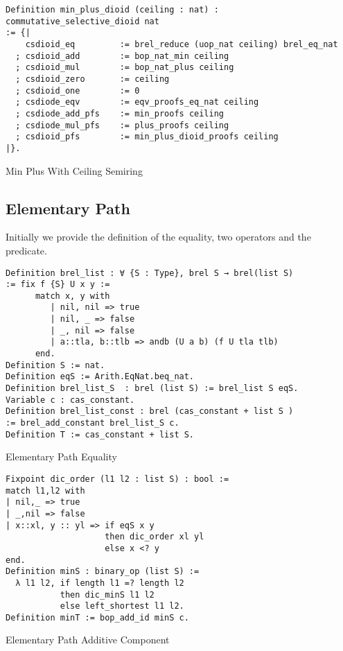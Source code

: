 \begin{listing}[H]
\begin{verbatim}
Definition min_plus_dioid (ceiling : nat) : commutative_selective_dioid nat 
:= {|
    csdioid_eq         := brel_reduce (uop_nat ceiling) brel_eq_nat
  ; csdioid_add        := bop_nat_min ceiling
  ; csdioid_mul        := bop_nat_plus ceiling                                  
  ; csdioid_zero       := ceiling
  ; csdioid_one        := 0
  ; csdiode_eqv        := eqv_proofs_eq_nat ceiling
  ; csdiode_add_pfs    := min_proofs ceiling 
  ; csdiode_mul_pfs    := plus_proofs ceiling                                      
  ; csdioid_pfs        := min_plus_dioid_proofs ceiling 
|}.
\end{verbatim}
\caption{Min Plus With Ceiling Semiring} 
\label{coq:def:min_plus_dioid}
\end{listing}

\subsection{Elementary Path}
Initially we provide the definition of the equality, two operators and the predicate. 

\begin{listing}[H]
\begin{verbatim}
Definition brel_list : ∀ {S : Type}, brel S → brel(list S)
:= fix f {S} U x y := 
      match x, y with
         | nil, nil => true 
         | nil, _ => false 
         | _, nil => false 
         | a::tla, b::tlb => andb (U a b) (f U tla tlb)
      end.
Definition S := nat.
Definition eqS := Arith.EqNat.beq_nat.
Definition brel_list_S  : brel (list S) := brel_list S eqS.
Variable c : cas_constant.
Definition brel_list_const : brel (cas_constant + list S ) 
:= brel_add_constant brel_list_S c. 
Definition T := cas_constant + list S.
\end{verbatim}
\caption{Elementary Path Equality} 
\label{coq:def:elementary_path_eq}
\end{listing}

\begin{listing}[H]
\begin{verbatim}
Fixpoint dic_order (l1 l2 : list S) : bool :=
match l1,l2 with
| nil,_ => true
| _,nil => false    
| x::xl, y :: yl => if eqS x y
                    then dic_order xl yl
                    else x <? y 
end.
Definition minS : binary_op (list S) :=
  λ l1 l2, if length l1 =? length l2
           then dic_minS l1 l2 
           else left_shortest l1 l2.
Definition minT := bop_add_id minS c.
\end{verbatim}
\caption{Elementary Path Additive Component} 
\label{coq:def:elementary_path_min}
\end{listing}

